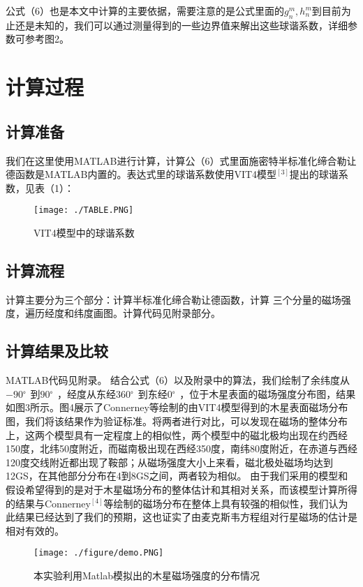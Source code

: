 \documentclass{article}
\begin{document}
公式（6）也是本文中计算的主要依据，需要注意的是公式里面的$g_n^m,h_n^m$到目前为止还是未知的，我们可以通过测量得到的一些边界值来解出这些球谐系数，详细参数可参考图2。





\section{计算过程}


\subsection{计算准备}
  我们在这里使用MATLAB进行计算，计算公（6）式里面施密特半标准化缔合勒让德函数是MATLAB内置的。表达式里的球谐系数使用VIT4模型$^{[3]}$提出的球谐系数，见表（1）：

\begin{figure}
    \centering
    \texttt{[image: ./TABLE.PNG]}  
    \caption{VIT4模型中的球谐系数}
    \label{fig:my_label}
\end{figure}


\subsection{计算流程}
计算主要分为三个部分：计算半标准化缔合勒让德函数，计算 三个分量的磁场强度，遍历经度和纬度画图。计算代码见附录部分。

\subsection{计算结果及比较}
MATLAB代码见附录。
结合公式（6）以及附录中的算法，我们绘制了余纬度从$-90^{。}$到$90^{。}$，经度从东经$360^{。}$到东经$0^{。}$，位于木星表面的磁场强度分布图，结果如图3所示。图4展示了Connerney等绘制的由VIT4模型得到的木星表面磁场分布图，我们将该结果作为验证标准。将两者进行对比，可以发现在磁场的整体分布上，这两个模型具有一定程度上的相似性，两个模型中的磁北极均出现在约西经150度，北纬50度附近，而磁南极出现在西经350度，南纬80度附近，在赤道与西经120度交线附近都出现了鞍部；从磁场强度大小上来看，磁北极处磁场均达到12GS，在其他部分分布在4到8GS之间，两者较为相似。
由于我们采用的模型和假设希望得到的是对于木星磁场分布的整体估计和其相对关系，而该模型计算所得的结果与Connerney$^{[4]}$等绘制的磁场分布在整体上具有较强的相似性，我们认为此结果已经达到了我们的预期，这也证实了由麦克斯韦方程组对行星磁场的估计是相对有效的。




\begin{figure}
    \centering
    \texttt{[image: ./figure/demo.PNG]}
    \caption{本实验利用Matlab模拟出的木星磁场强度的分布情况}
    \label{fig:my_label}
\end{figure}
\end{document}
